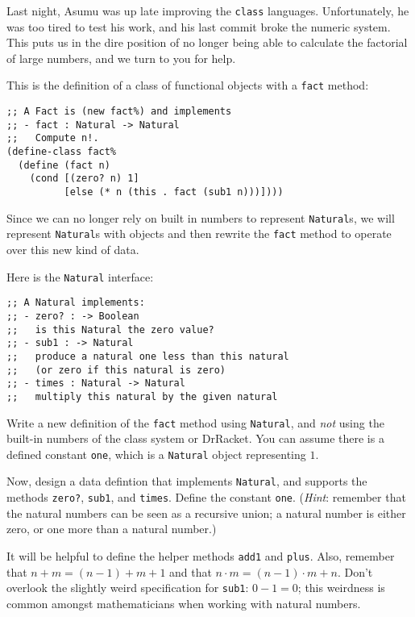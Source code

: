 \documentclass[12pt]{article}                   %
\def\pts#1{\marginpar{\footnotesize \raggedright  \fbox{#1 {\sc Points}}}}
\begin{document}
\begin{problem} \pts{15}
Last night, Asumu was up late improving the {\tt class} languages.
Unfortunately, he was too tired to test his work, and his last commit
broke the numeric system.
%
This puts us in the dire position of no longer being able to calculate
the factorial of large numbers, and we turn to you for help.

This is the definition of a class of functional objects
with a {\tt fact} method:

\begin{verbatim}
;; A Fact is (new fact%) and implements 
;; - fact : Natural -> Natural
;;   Compute n!.
(define-class fact%
  (define (fact n)
    (cond [(zero? n) 1]
          [else (* n (this . fact (sub1 n)))])))
\end{verbatim}

Since we can no longer rely on built in numbers to represent
\verb|Natural|s, we will represent \verb|Natural|s with objects and
then rewrite the \verb|fact| method to operate over this new kind of
data.

Here is the \verb|Natural| interface:

\begin{verbatim}
;; A Natural implements:
;; - zero? : -> Boolean
;;   is this Natural the zero value?
;; - sub1 : -> Natural
;;   produce a natural one less than this natural 
;;   (or zero if this natural is zero)
;; - times : Natural -> Natural
;;   multiply this natural by the given natural
\end{verbatim}

\newpage
Write a new definition of the \verb|fact| method using \verb|Natural|,
and \emph{not} using the built-in numbers of the class system or
DrRacket.  You can assume there is a defined constant \verb|one|,
which is a \verb|Natural| object representing $1$.

\ifrubric
\else
\fi

\newpage

Now, design a data defintion that implements \verb|Natural|, and
supports the methods \verb|zero?|, \verb|sub1|, and \verb|times|.
Define the constant \verb|one|.  (\emph{Hint}: remember that the
natural numbers can be seen as a recursive union; a natural number is
either zero, or one more than a natural number.)

It will be helpful to define the helper methods \verb|add1| and
\verb|plus|.  Also, remember that $n + m = (n-1) + m + 1$ and that $n
\cdot m = (n-1) \cdot m + n$.  Don't overlook the slightly weird
specification for \verb|sub1|: $0-1 = 0$; this weirdness is common
amongst mathematicians when working with natural numbers.

\ifrubric
\else
{}
\newpage
\fi
\end{problem}
\end{document}
